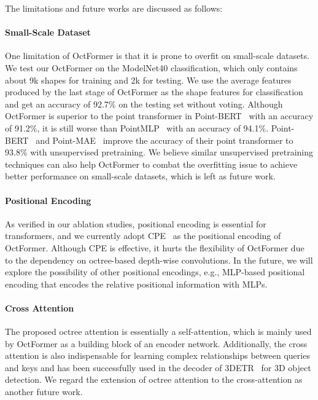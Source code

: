 \documentclass[acmtog,screen,authorversion]{acmart}
\begin{document}
The limitations and future works are discussed as follows:

\paragraph{Small-Scale Dataset}
One limitation of OctFormer is that it is prone to overfit on small-scale datasets.
We test our OctFormer on the ModelNet40 classification, which only contains about 9k shapes for training and 2k for testing.
We use the average features produced by the last stage of OctFormer as the shape features for classification and get an accuracy of 92.7\% on the testing set without voting.
Although OctFormer is superior to the point transformer in Point-BERT~\cite{Yu2022} with an accuracy of 91.2\%, it is still worse than PointMLP~\cite{Ma2022} with an accuracy of 94.1\%.
Point-BERT~\cite{Yu2022} and Point-MAE~\cite{Pang2022} improve the accuracy of their point transformer to 93.8\% with unsupervised pretraining.
We believe similar unsupervised pretraining techniques can also help  OctFormer to combat the overfitting issue to achieve better performance on small-scale datasets, which is left as future work.  

\paragraph{Positional Encoding}
As verified in our ablation studies, positional encoding is essential for transformers, and we currently adopt CPE~\cite{Chu2021} as the positional encoding of OctFormer.
Although CPE is effective, it hurts the flexibility of OctFormer due to the dependency on octree-based depth-wise convolutions.
In the future, we will explore the possibility of other positional encodings, e.g., MLP-based positional encoding that encodes the relative positional information with MLPs.

\paragraph{Cross Attention}
The proposed octree attention is essentially a self-attention, which is mainly used by OctFormer as a building block of an encoder network.
Additionally, the cross attention is also indispensable for learning complex relationships between queries and keys and has been successfully used in the decoder of 3DETR~\cite{Misra2021} for 3D object detection.
We regard the extension of octree attention to the cross-attention as another future work.
\end{document}
